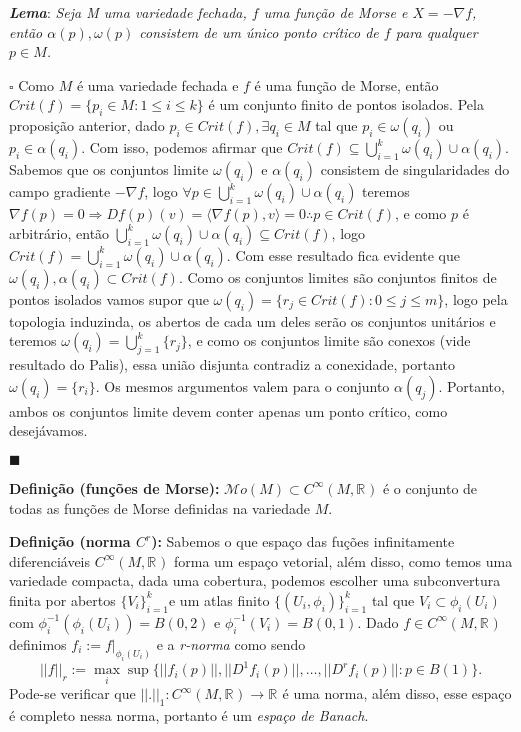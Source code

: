 \documentclass[12pt]{book}
\newcommand{\real}[1]{\mathbb{R}^{#1}}
\newcommand{\definicaonomeada}[2]{\vspace{2mm} \textbf{Definição (#1):}{ #2}}
\newcommand{\tese}[3]{\vspace{2mm} \textit{\textbf{#1}}: \textit{#2} \par $\square$ #3 \par $\blacksquare$}
\newcommand{\innerprod}[2]{\langle #1, #2 \rangle}
\newcommand{\morsefunc}[1]{\mathcal{M}o(#1)}
\newcommand{\suavefunc}[1]{C^{\infty}(#1, \real{})}
\begin{document}
	\tese{Lema}{Seja M uma variedade fechada, $f$ uma função de Morse e $X =-\nabla f$, então $\alpha(p), \omega(p)$ consistem de um único ponto crítico de $f$ para qualquer $p \in M$.}
	{Como $M$ é uma variedade fechada e $f$ é uma função de Morse, então $Crit(f) = \{p_{i} \in M: 1\leq i \leq k \}$ é um conjunto finito de pontos isolados. Pela proposição anterior, dado $p_{i} \in Crit(f), \exists q_{i} \in M$ tal que $p_{i} \in \omega(q_{i})$ ou $p_{i} \in \alpha(q_{i})$. Com isso, podemos afirmar que $Crit(f) \subseteq \bigcup_{i=1}^{k}\omega(q_{i}) \cup \alpha(q_{i})$. Sabemos que os conjuntos limite $\omega(q_{i})$ e $\alpha(q_{i})$ consistem de singularidades do campo gradiente $-\nabla f$, logo $\forall p \in \bigcup_{i=1}^{k}\omega(q_{i}) \cup \alpha(q_{i})$ teremos $\nabla f(p) = 0 \Rightarrow Df(p)(v) = \innerprod{\nabla f(p)}{v} = 0 \therefore p \in Crit(f)$, e como $p$ é arbitrário, então $\bigcup_{i=1}^{k}\omega(q_{i}) \cup \alpha(q_{i}) \subseteq Crit(f)$, logo $Crit(f) = \bigcup_{i=1}^{k}\omega(q_{i}) \cup \alpha(q_{i})$. Com esse resultado fica evidente que $\omega(q_{i}), \alpha(q_{i}) \subset Crit(f)$. Como os conjuntos limites são conjuntos finitos de pontos isolados vamos supor que $\omega(q_{i}) = \{r_{j} \in Crit(f): 0\leq j \leq m\}$, logo pela topologia induzinda, os abertos de cada um deles serão os conjuntos unitários e teremos $\omega(q_{i}) = \bigcup_{j=1}^{k} \{r_{j}\} $, e como os conjuntos limite são conexos (vide resultado do Palis), essa união disjunta contradiz a conexidade, portanto $\omega(q_{i}) = \{r_{i}\}$. Os mesmos argumentos valem para o conjunto $\alpha(q_{j})$. Portanto, ambos os conjuntos limite devem conter apenas um ponto crítico, como desejávamos.}
	
	\definicaonomeada{funções de Morse}{$\morsefunc{M} \subset \suavefunc{M}$ é o conjunto de todas as funções de Morse definidas na variedade $M$.}
	
	\definicaonomeada{norma $C^{r}$}{Sabemos o que espaço das fuções infinitamente diferenciáveis $\suavefunc{M}$ forma um espaço vetorial, além disso, como temos uma variedade compacta, dada uma cobertura, podemos escolher uma subconvertura finita por abertos $\{V_{i}\}_{i=1}^{k}$e um atlas finito $\{(U_{i}, \phi_{i})\}_{i=1}^{k}$ tal que $V_{i} \subset \phi_{i}(U_{i})$ com $\phi_{i}^{-1}(\phi_{i}(U_{i})) = B(0,2)$ e $\phi_{i}^{-1}(V_{i}) = B(0,1)$. Dado $f \in \suavefunc{M}$ definimos $f_{i} := f|_{\phi_{i}(U_{i})}$ e a \textit{r-norma} como sendo 
	$$
	||f||_{r} := \max_{i} \sup\{||f_{i}(p)||, ||D^{1}f_{i}(p)||, \dots, ||D^{r}f_{i}(p)||: p \in B(1)\}.
	$$
	Pode-se verificar que $||.||_{1}: \suavefunc{M} \to \real{}$ é uma norma, além disso, esse espaço é completo nessa norma, portanto é um \textit{espaço de Banach}.}
\end{document}
